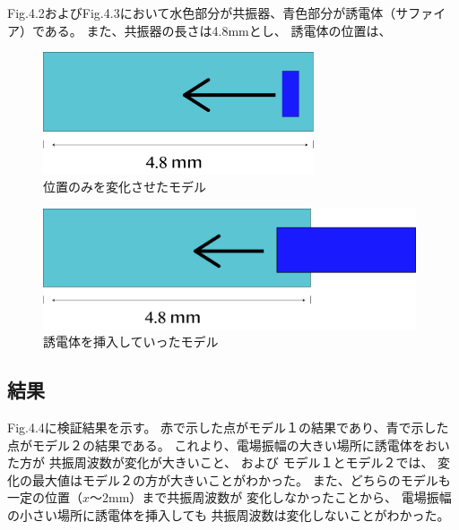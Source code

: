 Fig.4.2およびFig.4.3において水色部分が共振器、青色部分が誘電体（サファイア）である。
また、共振器の長さは4.8mmとし、
誘電体の位置は、

\vspace{10 mm}

\begin{figure}[h]
  \begin{center}
    \includegraphics[width=8cm]{./image/pos.png}
    \caption{位置のみを変化させたモデル}
    \label{fig:potition}
  \end{center}
\end{figure}

\vspace{10 mm}

\begin{figure}[h]
  \begin{center}
    \includegraphics[width=11cm]{./image/length.png}
    \caption{誘電体を挿入していったモデル}
    \label{fig:length}
  \end{center}
\end{figure}

\subsection*{結果}
Fig.4.4に検証結果を示す。
赤で示した点がモデル１の結果であり、青で示した点がモデル２の結果である。
これより、電場振幅の大きい場所に誘電体をおいた方が
共振周波数が変化が大きいこと、
および
モデル１とモデル２では、
変化の最大値はモデル２の方が大きいことがわかった。
また、どちらのモデルも一定の位置（$x$〜2mm）まで共振周波数が
変化しなかったことから、
電場振幅の小さい場所に誘電体を挿入しても
共振周波数は変化しないことがわかった。

